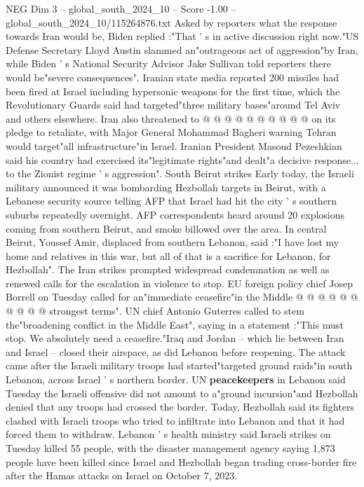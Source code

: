 \begin{textsample}{NEG Dim 3 – global\_south\_2024\_10 – Score -1.00 – global\_south\_2024\_10/115264876.txt}
Asked by reporters what the response towards Iran would be, Biden replied :"That ' s in active discussion right now."US Defense Secretary Lloyd Austin slammed an"outrageous act of aggression"by Iran, while Biden ' s National Security Advisor Jake Sullivan told reporters there would be"severe consequences".
Iranian state media reported 200 missiles had been fired at Israel including hypersonic weapons for the first time, which the Revolutionary Guards said had targeted"three military bases"around Tel Aviv and others elsewhere.
Iran also threatened to @ @ @ @ @ @ @ @ @ @ on its pledge to retaliate, with Major General Mohammad Bagheri warning Tehran would target"all infrastructure"in Israel.
Iranian President Masoud Pezeshkian said his country had exercised its"legitimate rights"and dealt"a decisive response... to the Zionist regime ' s aggression".
South Beirut strikes Early today, the Israeli military announced it was bombarding Hezbollah targets in Beirut, with a Lebanese security source telling AFP that Israel had hit the city ' s southern suburbs repeatedly overnight.
AFP correspondents heard around 20 explosions coming from southern Beirut, and smoke billowed over the area.
In central Beirut, Youssef Amir, displaced from southern Lebanon, said :"I have lost my home and relatives in this war, but all of that is a sacrifice for Lebanon, for Hezbollah".
The Iran strikes prompted widespread condemnation as well as renewed calls for the escalation in violence to stop.
EU foreign policy chief Josep Borrell on Tuesday called for an"immediate ceasefire"in the Middle @ @ @ @ @ @ @ @ @ @ strongest terms".
UN chief Antonio Guterres called to stem the"broadening conflict in the Middle East", saying in a statement :"This must stop.
We absolutely need a ceasefire."Iraq and Jordan -- which lie between Iran and Israel -- closed their airspace, as did Lebanon before reopening.
The attack came after the Israeli military troops had started"targeted ground raids"in south Lebanon, across Israel ' s northern border.
UN \textbf{peacekeepers} in Lebanon said Tuesday the Israeli offensive did not amount to a"ground incursion"and Hezbollah denied that any troops had crossed the border.
Today, Hezbollah said its fighters clashed with Israeli troops who tried to infiltrate into Lebanon and that it had forced them to withdraw.
Lebanon ' s health ministry said Israeli strikes on Tuesday killed 55 people, with the disaster management agency saying 1,873 people have been killed since Israel and Hezbollah began trading cross-border fire after the Hamas attacks on Israel on October 7, 2023.

\end{textsample}
